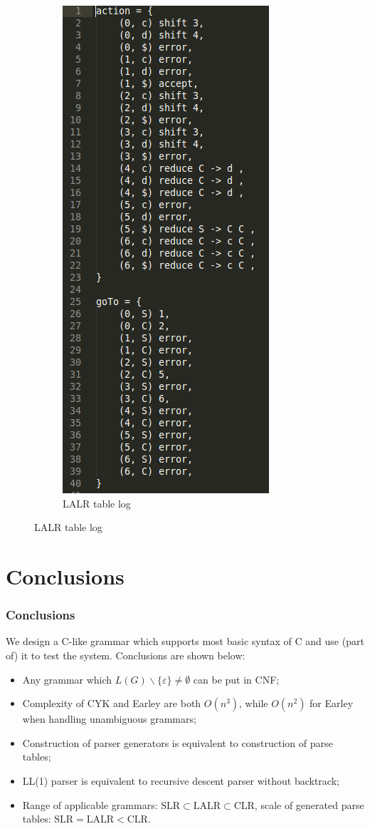 \documentclass{beamer}
\begin{document}
\begin{frame}
\begin{figure}
\begin{subfigure}[b]{0.3\textwidth}
        \includegraphics[height=0.8\textheight]{LogLALRTable.png}
        \caption{LALR table log}
        \label{fig:lalrtable}
    \end{subfigure}
\end{figure}
\end{frame}

\section{Conclusions}
 \begin{frame}
 \frametitle{Conclusions}
 We design a C-like grammar which supports most basic syntax of C and use (part of) it to test the system. Conclusions are shown below:
\begin{itemize}
\item Any grammar which $L(G)\backslash\{\varepsilon\}\neq \emptyset$ can be put in CNF;
\item Complexity of CYK and Earley are both $O(n^3)$, while $O(n^2)$ for Earley when handling unambiguous grammars;
\item Construction of parser generators is equivalent to construction of parse tables;
\item LL(1) parser is equivalent to recursive descent parser without backtrack;
\item Range of applicable grammars: $\mathrm{SLR}\subset\mathrm{LALR}\subset\mathrm{CLR} $, scale of generated parse tables: $\mathrm{SLR}=\mathrm{LALR}<\mathrm{CLR} $.
\end{itemize}
 \end{frame}
\end{document}
